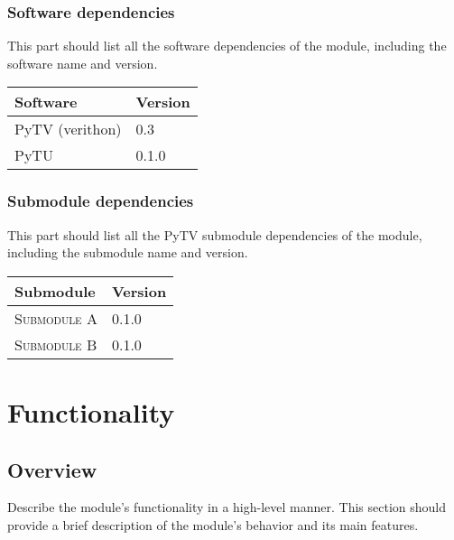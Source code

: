 \documentclass[a4paper, oneside]{report}
\begin{document}
            \subsection{Software dependencies}
                This part should list all the software dependencies of the module, including the software name and version.
                \begin{longtable}{ll}
                    \toprule
                    \textbf{Software} & \textbf{Version} \\
                    \midrule
                    PyTV (verithon)     & 0.3 \\
                    PyTU                & 0.1.0 \\
                    \bottomrule
                \end{longtable}

            \subsection{Submodule dependencies}
                This part should list all the PyTV submodule dependencies of the module, including the submodule name and version.
                \begin{longtable}{ll}
                    \toprule
                    \textbf{Submodule} & \textbf{Version} \\
                    \midrule
                    \textsc{Submodule A}         & 0.1.0 \\
                    \textsc{Submodule B}         & 0.1.0 \\
                    \bottomrule
                \end{longtable}

    \chapter{Functionality}
        \section{Overview}
            Describe the module's functionality in a high-level manner. This section should provide a brief description of the module's behavior and its main features.
\end{document}
